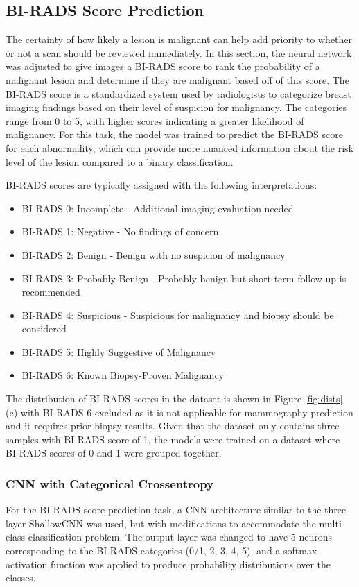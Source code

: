 \documentclass[12pt]{article}
\begin{document}
\subsection{BI-RADS Score Prediction}
The certainty of how likely a lesion is malignant can help add priority to whether or not a
scan should be reviewed immediately. In this section, the neural network was adjusted to give images
a BI-RADS score to rank the probability of a malignant lesion and determine if they are
malignant based off of this score. The BI-RADS score is a standardized system used by radiologists to categorize breast imaging findings based on their level of suspicion for malignancy. The categories range from 0 to 5, with higher scores indicating a greater likelihood of malignancy. For this task, the model was trained to predict the BI-RADS score for each abnormality, which can provide more nuanced information about the risk level of the lesion compared to a binary classification.

\medskip \noindent
BI-RADS scores are typically assigned with the following interpretations:
\begin{itemize}
    \setlength\itemsep{.01\smallskipamount}
    \item BI-RADS 0: Incomplete - Additional imaging evaluation needed
    \item BI-RADS 1: Negative - No findings of concern
    \item BI-RADS 2: Benign - Benign with no suspicion of malignancy
    \item BI-RADS 3: Probably Benign - Probably benign but short-term follow-up is recommended
    \item BI-RADS 4: Suspicious - Suspicious for malignancy and biopsy should be considered
    \item BI-RADS 5: Highly Suggestive of Malignancy
    \item BI-RADS 6: Known Biopsy-Proven Malignancy 
\end{itemize}


\medskip \noindent
The distribution of BI-RADS scores in the dataset is shown in Figure \ref{fig:dists} (c) with BI-RADS 6 excluded as it is not applicable for mammography prediction and it requires prior biopsy results. Given that the dataset only contains three samples with BI-RADS score of 1, the models were trained on a dataset where BI-RADS scores of 0 and 1 were grouped together.

\subsubsection{CNN with Categorical Crossentropy}
For the BI-RADS score prediction task, a CNN architecture similar to the three-layer ShallowCNN was used, but with modifications to accommodate the multi-class classification problem. The output layer was changed to have 5 neurons corresponding to the BI-RADS categories (0/1, 2, 3, 4, 5), and a softmax activation function was applied to produce probability distributions over the classes. 
\end{document}
